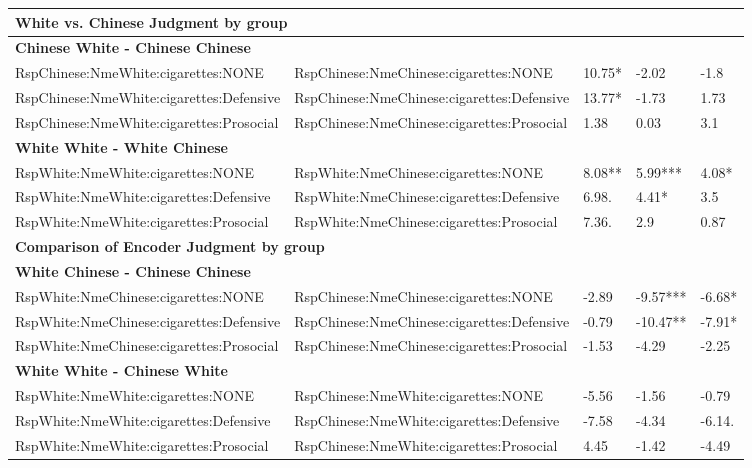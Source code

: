 \documentclass[]{report}
\begin{document}
\begin{table}[ht]
{\begin{tabular}{lllll}
		
		
	    \hline
		 \multicolumn{2}{l}{\textbf{White vs. Chinese Judgment by group}} &  &  &  \\ 
		\hline
		\textbf{Chinese White - Chinese Chinese} &  &  &  &  \\
		RspChinese:NmeWhite:cigarettes:NONE  &  RspChinese:NmeChinese:cigarettes:NONE & 10.75* & -2.02 & -1.8 \\ 
		RspChinese:NmeWhite:cigarettes:Defensive  &  RspChinese:NmeChinese:cigarettes:Defensive & 13.77* & -1.73 & 1.73 \\ 
		RspChinese:NmeWhite:cigarettes:Prosocial  &  RspChinese:NmeChinese:cigarettes:Prosocial & 1.38 & 0.03 & 3.1 \\ 
		\textbf{White White - White Chinese} &  &  &  &  \\ 
		RspWhite:NmeWhite:cigarettes:NONE  &  RspWhite:NmeChinese:cigarettes:NONE & 8.08** & 5.99*** & 4.08* \\ 
		RspWhite:NmeWhite:cigarettes:Defensive  &  RspWhite:NmeChinese:cigarettes:Defensive & 6.98. & 4.41* & 3.5 \\ 
		RspWhite:NmeWhite:cigarettes:Prosocial  &  RspWhite:NmeChinese:cigarettes:Prosocial & 7.36. & 2.9 & 0.87 \\ 

		

		
					    \hline
		 \multicolumn{2}{l}{\textbf{Comparison of Encoder Judgment by group}}  &  &  &  \\ 
		\hline
		
		\textbf{White Chinese - Chinese Chinese} &  &  &  &  \\ 
		RspWhite:NmeChinese:cigarettes:NONE  &  RspChinese:NmeChinese:cigarettes:NONE & -2.89 & -9.57*** & -6.68* \\ 
		RspWhite:NmeChinese:cigarettes:Defensive  &  RspChinese:NmeChinese:cigarettes:Defensive & -0.79 & -10.47** & -7.91* \\ 
		RspWhite:NmeChinese:cigarettes:Prosocial  &  RspChinese:NmeChinese:cigarettes:Prosocial & -1.53 & -4.29 & -2.25 \\ 
		\textbf{White White - Chinese White} &  &  &  &  \\ 
		RspWhite:NmeWhite:cigarettes:NONE  &  RspChinese:NmeWhite:cigarettes:NONE & -5.56 & -1.56 & -0.79 \\ 
		RspWhite:NmeWhite:cigarettes:Defensive  &  RspChinese:NmeWhite:cigarettes:Defensive & -7.58 & -4.34 & -6.14. \\ 
		RspWhite:NmeWhite:cigarettes:Prosocial  &  RspChinese:NmeWhite:cigarettes:Prosocial & 4.45 & -1.42 & -4.49 \\ 
		
	
	
			\hline
\end{tabular}}
\end{table}   
\end{document}
